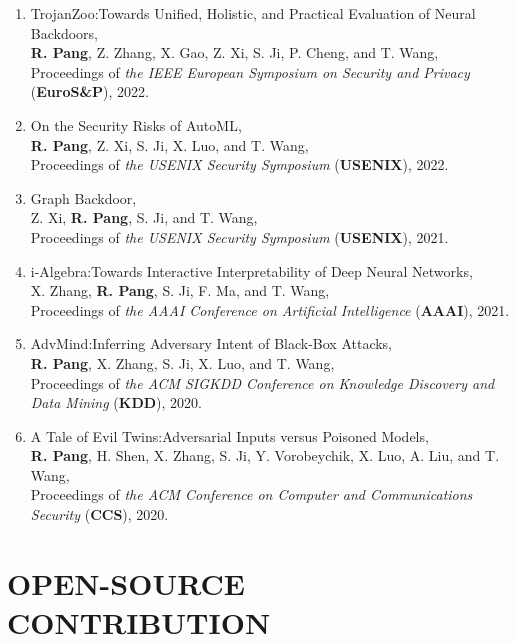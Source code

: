 \documentclass[letterpaper,11pt]{article}
\begin{document}
\begin{enumerate}[labelsep=15pt, parsep=-4pt]
    \item TrojanZoo:\@ Towards Unified, Holistic, and Practical Evaluation of Neural Backdoors,\\
    \textbf{R. Pang}, Z. Zhang, X. Gao, Z. Xi, S. Ji, P. Cheng, and T. Wang,\\
    Proceedings of {\it the IEEE European Symposium on Security and Privacy\/} (\textbf{EuroS\&P}), 2022.
    
    \item On the Security Risks of AutoML,\\
    \textbf{R. Pang}, Z. Xi, S. Ji, X. Luo, and T. Wang,\\
    Proceedings of {\it the USENIX Security Symposium\/} (\textbf{USENIX}), 2022.
    
    \item Graph Backdoor,\\
    Z. Xi, \textbf{R. Pang}, S. Ji, and T. Wang,\\
    Proceedings of {\it the USENIX Security Symposium\/} (\textbf{USENIX}), 2021.
    
    \item i-Algebra:\@ Towards Interactive Interpretability of Deep Neural Networks,\\
    X. Zhang, \textbf{R. Pang}, S. Ji, F. Ma, and T. Wang,\\
    Proceedings of {\it the AAAI Conference on Artificial Intelligence\/} (\textbf{AAAI}), 2021.
    
    \item AdvMind:\@ Inferring Adversary Intent of Black-Box Attacks,\\
    \textbf{R. Pang}, X. Zhang, S. Ji, X. Luo, and T. Wang,\\
    Proceedings of {\it the ACM SIGKDD Conference on Knowledge Discovery and Data Mining\/} (\textbf{KDD}), 2020.

    \item A Tale of Evil Twins:\@ Adversarial Inputs versus Poisoned Models,\\
    \textbf{R. Pang}, H. Shen, X. Zhang, S. Ji, Y. Vorobeychik, X. Luo, A. Liu, and T. Wang,\\
    Proceedings of {\it the ACM Conference on Computer and Communications Security\/} (\textbf{CCS}), 2020.

    \end{enumerate}


\section{OPEN-SOURCE CONTRIBUTION}
\end{document}
